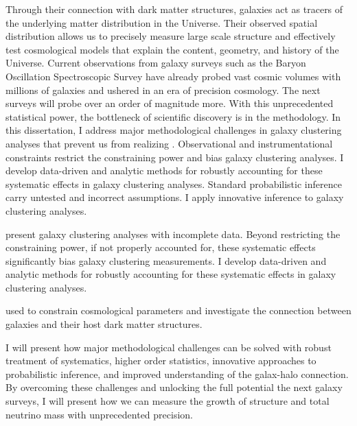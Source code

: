 Through their connection with dark matter structures, galaxies act as 
tracers of the underlying matter distribution in the Universe. Their 
observed spatial distribution allows us to precisely measure large scale 
structure and effectively test cosmological models that explain the content, 
geometry, and history of the Universe. Current observations from galaxy 
surveys such as the Baryon Oscillation Spectroscopic Survey
have already probed vast cosmic volumes with millions of galaxies 
and ushered in an era of precision cosmology. The next surveys will 
probe over an order of magnitude more. With this unprecedented statistical 
power, the bottleneck of scientific discovery is in the methodology.
In this dissertation, I address major methodological challenges in 
galaxy clustering analyses that prevent us from realizing .
Observational and instrumentational constraints restrict the 
constraining power and bias galaxy clustering analyses. I develop
data-driven and analytic methods for robustly accounting for these
systematic effects in galaxy clustering analyses. 
Standard probabilistic inference carry untested and incorrect assumptions. 
I apply innovative inference to galaxy clustering analyses. 




present galaxy 
clustering analyses with incomplete data. Beyond restricting the 
constraining power, if not properly accounted for, these systematic 
effects significantly bias galaxy clustering measurements. I develop 
data-driven and analytic methods for robustly accounting for these
systematic effects in galaxy clustering analyses. 


used to constrain cosmological parameters 
and investigate the connection between galaxies and their host dark 
matter structures.




I will present how major methodological challenges can be solved with robust 
treatment of systematics, higher order statistics, innovative approaches to 
probabilistic inference, and improved understanding of the galax-halo connection. 
By overcoming these challenges and unlocking the full potential the next galaxy 
surveys, I will present how we can measure the growth of structure and total 
neutrino mass with unprecedented precision.


